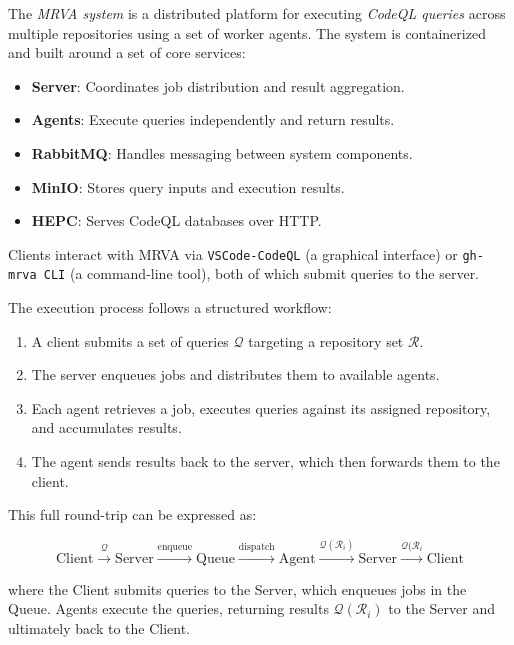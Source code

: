 \documentclass[11pt]{article}
\begin{document}
The \textit{MRVA system} is a distributed platform for executing \textit{CodeQL
queries} across multiple repositories using a set of worker agents. The system is
{containerized} and built around a set of core services:

\begin{itemize}
    \item \textbf{Server}: Coordinates job distribution and result aggregation.
    \item \textbf{Agents}: Execute queries independently and return results.
    \item \textbf{RabbitMQ}: Handles messaging between system components.
    \item \textbf{MinIO}: Stores query inputs and execution results.
    \item \textbf{HEPC}: Serves CodeQL databases over HTTP.
\end{itemize}

Clients interact with MRVA via \texttt{VSCode-CodeQL} (a graphical interface) or
\texttt{gh-mrva CLI} (a command-line tool), both of which submit queries to the
server.

The execution process follows a structured workflow:

\begin{enumerate}
    \item A client submits a set of queries $\mathcal{Q}$ targeting a repository
      set $\mathcal{R}$.
    \item The server enqueues jobs and distributes them to available agents.
    \item Each agent retrieves a job, executes queries against its assigned repository, and accumulates results.
    \item The agent sends results back to the server, which then forwards them to the client.
\end{enumerate}

This full round-trip can be expressed as:

\begin{equation}
    \text{Client} \xrightarrow{\mathcal{Q}} \text{Server}
    \xrightarrow{\text{enqueue}} 
    \text{Queue} \xrightarrow{\text{dispatch}} \text{Agent}
    \xrightarrow{\mathcal{Q}(\mathcal{R}_i)}
    \text{Server} \xrightarrow{\mathcal{Q}(\mathcal{R}_i} \text{Client}
\end{equation}

where the Client submits queries to the Server, which enqueues jobs in the
Queue. Agents execute the queries, returning results $\mathcal{Q}(\mathcal{R}_i)$
to the Server and ultimately back to the Client.
\end{document}
